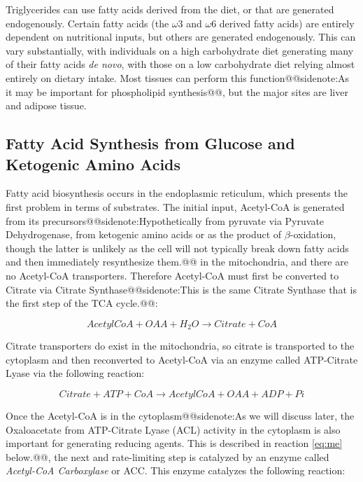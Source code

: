 \documentclass{tufte-handout}
\makeatletter
\def\sidenote#1{@@sidenote:#1@@}
\makeatother
\begin{document}
Triglycerides can use fatty acids derived from the diet, or that are generated endogenously.  Certain fatty acids (the $\omega$3 and $\omega$6 derived fatty acids) are entirely dependent on nutritional inputs, but others are generated endogenously.  This can vary substantially, with individuals on a high carbohydrate diet generating many of their fatty acids \textit{de novo}, with those on a low carbohydrate diet relying almost entirely on dietary intake.  Most tissues can perform this function\sidenote{As it may be important for phospholipid synthesis}, but the major sites are liver and adipose tissue.

\subsection{Fatty Acid Synthesis from Glucose and Ketogenic Amino Acids}


Fatty acid biosynthesis occurs in the endoplasmic reticulum, which presents the first problem in terms of substrates.  The initial input, Acetyl-CoA is generated from its precursors\sidenote{Hypothetically from pyruvate via Pyruvate Dehydrogenase\index{Enzymes!Pyruvate Dehydrogenase}, from ketogenic amino acids or as the product of $\beta$-oxidation, though the latter is unlikely as the cell will not typically break down fatty acids and then immediately resynthesize them.} in the mitochondria, and there are no Acetyl-CoA transporters.  Therefore Acetyl-CoA must first be converted to Citrate via Citrate Synthase\sidenote{This is the same Citrate Synthase that is the first step of the TCA cycle.}:


\begin{equation}\label{eq:cs-ls}
AcetylCoA + OAA + H_2O \rightarrow Citrate + CoA
\end{equation}


Citrate transporters do exist in the mitochondria, so citrate is transported to the cytoplasm and then reconverted to Acetyl-CoA via an enzyme called ATP-Citrate Lyase via the following reaction:

\begin{equation}\label{eq:acl}
Citrate + ATP + CoA \rightarrow AcetylCoA + OAA + ADP + Pi
\end{equation}

Once the Acetyl-CoA is in the cytoplasm\sidenote{As we will discuss later, the Oxaloacetate from ATP-Citrate Lyase (ACL) activity in the cytoplasm is also important for generating reducing agents.  This is described in reaction \ref{eq:me} below.}, the next and rate-limiting step is catalyzed by an enzyme called \emph{Acetyl-CoA Carboxylase} or ACC.  This enzyme catalyzes the following reaction:
\end{document}
